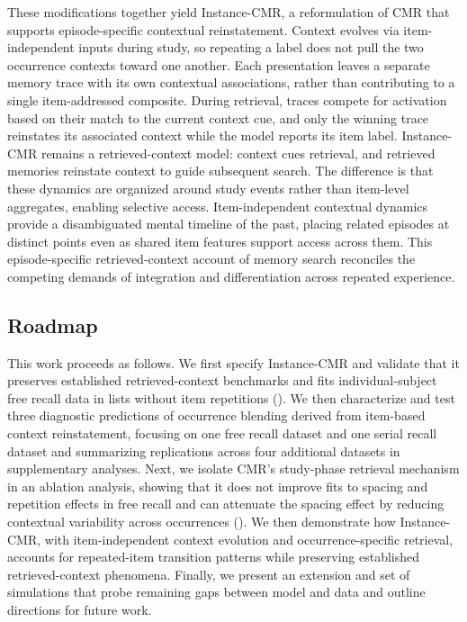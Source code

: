 \documentclass[
  man,
  floatsintext,
  longtable,
  nolmodern,
  notxfonts,
  notimes,
  draftfirst,
  colorlinks=true,linkcolor=blue,citecolor=blue,urlcolor=blue]{apa7}
\begin{document}
These modifications together yield Instance-CMR, a reformulation of CMR
that supports episode-specific contextual reinstatement. Context evolves
via item-independent inputs during study, so repeating a label does not
pull the two occurrence contexts toward one another. Each presentation
leaves a separate memory trace with its own contextual associations,
rather than contributing to a single item-addressed composite. During
retrieval, traces compete for activation based on their match to the
current context cue, and only the winning trace reinstates its
associated context while the model reports its item label. Instance-CMR
remains a retrieved-context model: context cues retrieval, and retrieved
memories reinstate context to guide subsequent search. The difference is
that these dynamics are organized around study events rather than
item-level aggregates, enabling selective access. Item-independent
contextual dynamics provide a disambiguated mental timeline of the past,
placing related episodes at distinct points even as shared item features
support access across them. This episode-specific retrieved-context
account of memory search reconciles the competing demands of integration
and differentiation across repeated experience.

\subsection{Roadmap}\label{roadmap}

This work proceeds as follows. We first specify Instance-CMR and
validate that it preserves established retrieved-context benchmarks and
fits individual-subject free recall data in lists without item
repetitions ().
We then characterize and test three diagnostic predictions of occurrence
blending derived from item-based context reinstatement, focusing on one
free recall dataset and one serial recall dataset and summarizing
replications across four additional datasets in supplementary analyses.
Next, we isolate CMR's study-phase retrieval mechanism in an ablation
analysis, showing that it does not improve fits to spacing and
repetition effects in free recall and can attenuate the spacing effect
by reducing contextual variability across occurrences
(). We then
demonstrate how Instance-CMR, with item-independent context evolution
and occurrence-specific retrieval, accounts for repeated-item transition
patterns while preserving established retrieved-context phenomena.
Finally, we present an extension and set of simulations that probe
remaining gaps between model and data and outline directions for future
work.
\end{document}
